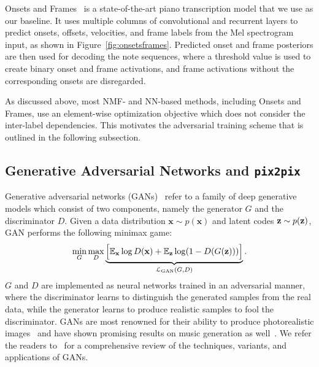 Onsets and Frames~\cite{hawthorne2018onsetsframes} is a state-of-the-art piano transcription model that we use as our baseline.
It uses multiple columns of convolutional and recurrent layers to predict onsets, offsets, velocities, and frame labels from the Mel spectrogram input, as shown in Figure~\ref{fig:onsetsframes}.
Predicted onset and frame \def\x{{\mathbf x}}
\def\L{{\cal L}}
posteriors are then used for decoding the note sequences, where a threshold value is used to create binary onset and frame activations, and frame activations without the corresponding onsets are disregarded.


As discussed above, most NMF- and NN-based methods, including Onsets and Frames, use an element-wise optimization objective which does not consider the inter-label dependencies.
This motivates the adversarial training scheme that is outlined in the following subsection.

\subsection{Generative Adversarial Networks and \texttt{pix2pix}}

Generative adversarial networks (GANs)~\cite{goodfellow2014gan} refer to a family of deep generative models which consist of two components, namely the generator $G$ and the discriminator $D$.
Given a data distribution $\x \sim p(\x)$ and latent codes $\mathbf{z} \sim p(\mathbf{z})$, GAN performs the following minimax game:
\begin{equation}\label{eqn:gan}
\min_{G} \max_{D} \underbrace{\Big [ \E_{\x} \log D(\x) + \E_{\z} \log (1 - D ( G(\z))) \Big ]}_{\L_{\text{GAN}}(G, D)}.
\end{equation}
$G$ and $D$ are implemented as neural networks trained in an adversarial manner, where the discriminator learns to distinguish the generated samples from the real data, while the generator learns to produce realistic samples to fool the discriminator.
GANs are most renowned for their ability to produce photorealistic images~\cite{karras2019stylegan} and have shown promising results on music generation as well~\cite{engel2019gansynth,dong2018musegan,yang2017midinet}.
We refer the readers to~\cite{goodfellow2016gan,creswell2017gan} for a comprehensive review of the techniques, variants, and applications of GANs.

